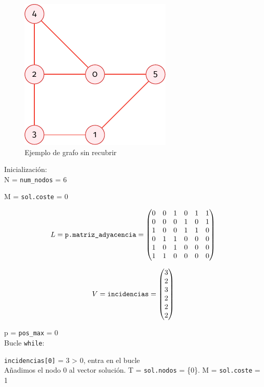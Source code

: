 \documentclass[11pt]{article}
\begin{document}
\begin{figure}[H]
	\caption{Ejemplo de grafo sin recubrir}
	\centering \includegraphics{./img/grafo-ejemplo-sin-recubrir.pdf}
\end{figure}

Inicialización:\\
N = \verb|num_nodos| = 6

M = \verb|sol.coste| = 0

$$  L = \verb|p.matriz_adyacencia| =
\begin{pmatrix}
	0 & 0 & 1 & 0 & 1 & 1 \\
	0 & 0 & 0 & 1 & 0 & 1 \\
	1 & 0 & 0 & 1 & 1 & 0 \\
	0 & 1 & 1 & 0 & 0 & 0 \\
	1 & 0 & 1 & 0 & 0 & 0 \\
	1 & 1 & 0 & 0 & 0 & 0
\end{pmatrix}$$

$$ V = \verb|incidencias| =
\begin{pmatrix}
	3 \\
	2 \\
	3 \\
	2 \\
	2 \\
	2
\end{pmatrix}$$

p = \verb|pos_max| = 0\\

Bucle \verb|while|:

\verb|incidencias[0]| = 3 > 0, entra en el bucle\\
Añadimos el nodo 0 al vector solución. T = \verb|sol.nodos| = \{0\}.
M = \verb|sol.coste| = 1\\
\end{document}
